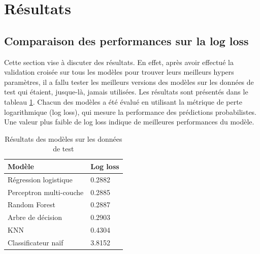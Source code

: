 \documentclass[12pt]{article}
\begin{document}
\newpage
\section{Résultats}
\label{sec:results}
\subsection{Comparaison des performances sur la log loss}
Cette section vise à discuter des résultats.
En effet, après avoir effectué la validation croisée sur tous les modèles pour trouver leurs meilleurs hypers paramètres, il a fallu tester les meilleurs versions des modèles sur les données de test qui étaient, jusque-là, jamais utilisées.
Les résultats sont présentés dans le tableau \ref{tab:results}.
Chacun des modèles a été évalué en utilisant la métrique de perte logarithmique (log loss), qui mesure la performance des prédictions probabilistes.
Une valeur plus faible de log loss indique de meilleures performances du modèle.

\begin{table}[htp]
    \centering
    \begin{tabular}{|l|l|}
        \hline
        \textbf{Modèle}         & \textbf{Log loss} \\ \hline
        Régression logistique   & 0.2882            \\ \hline
        Perceptron multi-couche & 0.2885            \\ \hline
        Random Forest           & 0.2887            \\ \hline
        Arbre de décision       & 0.2903            \\ \hline
        KNN                     & 0.4304            \\ \hline
        Classificateur naïf     & 3.8152            \\ \hline
    \end{tabular}
    \caption{Résultats des modèles sur les données de test}
    \label{tab:results}
\end{table}
\end{document}
